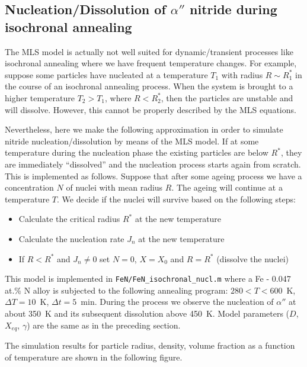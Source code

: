 \documentclass[12pt,a4paper]{article}
\begin{document}
\subsection{Nucleation/Dissolution of $\alpha ''$ nitride during isochronal annealing}

The MLS model is actually not well suited for dynamic/transient processes like isochronal annealing where we have frequent temperature changes. 
For example, suppose some particles have nucleated at a temperature $T_1$ with radius $R\sim R_1^*$ in the course of an isochronal annealing process. When the system is brought to a higher temperature $T_2>T_1$, where $R<R_2^*$, then the particles are unstable and will dissolve. However, this cannot be properly described by the MLS equations.

Nevertheless, here we make the following approximation in order to simulate nitride nucleation/dissolution by means of the MLS model. If at some temperature during the nucleation phase the existing particles are below $R^*$, they are immediately ``dissolved'' and the nucleation process starts again from scratch. This is implemented as follows. Suppose that after some ageing process we have a concentration $N$ of nuclei with mean radius $R$. The ageing will continue at a temperature $T$. We decide if the nuclei will survive based  on the following steps:
\begin{itemize}
\item Calculate the critical radius $R^*$ at the new temperature
\item Calculate the nucleation rate $J_n$ at the new temperature
\item If $R<R^*$ and $J_n \neq 0$ set $N=0$, $X=X_0$ and $R=R^*$ (dissolve the nuclei)
\end{itemize}

This model is implemented in \texttt{FeN/FeN\_isochronal\_nucl.m} where a Fe - 0.047 at.\% N alloy is subjected to the following annealing program: $280 < T < 600$~K, $\Delta T=10$~K, $\Delta t=5$~min. During the process we observe the nucleation of $\alpha''$ at about 350~K and its subsequent dissolution above 450~K. Model parameters ($D$, $X_{eq}$, $\gamma$) are the same as in the preceding section.

The simulation results for particle radius, density, volume fraction as a function of temperature are shown in the following figure. 
\end{document}
